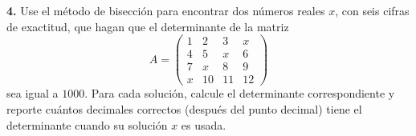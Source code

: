 \documentclass{article}
\newenvironment{statement}[1]{\smallskip\noindent\color[rgb]{1.00,0.00,0.50} {\bf #1.}}{}
\theoremstyle{definition}
\theoremstyle{remark}
\begin{document}
\begin{statement}{4}
  Use el m\'etodo de bisecci\'on para encontrar dos n\'umeros reales $x$, con
  seis cifras de exactitud, que hagan que el determinante de la matriz
  \[
    A = \begin{pmatrix}
      1 & 2 & 3 & x \\
      4 & 5 & x & 6 \\
      7 & x & 8 & 9 \\
      x & 10 & 11 & 12
    \end{pmatrix}  
  \]
  sea igual a $1000$. Para cada soluci\'on, calcule el determinante
  correspondiente y reporte cu\'antos decimales correctos (despu\'es del punto
  decimal) tiene el determinante cuando su soluci\'on $x$ es usada.
\end{statement}
\end{document}
